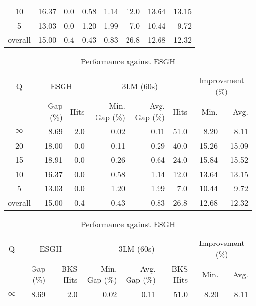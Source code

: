 \begin{table}[H]
\begin{tabular}{c rr rrr rr}
      10 &    16.37 &  0.0 &          0.58 &          1.14 & 12.0 &            13.64 & 13.15 \\
       5 &    13.03 &  0.0 &          1.20 &          1.99 &  7.0 &            10.44 &  9.72 \\
\midrule
 overall &    15.00 &  0.4 &          0.43 &          0.83 & 26.8 &            12.68 & 12.32 \\
\bottomrule
\end{tabular}
\end{table}\begin{table}[H]
\centering
\caption{Performance against ESGH}
\label{tab:3lm_resuts_kritikos1}
\begin{tabular}{c rr rrr rr}
\toprule
       Q & \multicolumn{2}{c}{ESGH} & \multicolumn{3}{c}{3LM (60s)} & \multicolumn{2}{c}{Improvement (\%)} \\
         & Gap (\%) & Hits & Min. Gap (\%) & Avg. Gap (\%) & Hits &             Min. &  Avg. \\
\midrule
$\infty$ &     8.69 &  2.0 &          0.02 &          0.11 & 51.0 &             8.20 &  8.11 \\
      20 &    18.00 &  0.0 &          0.11 &          0.29 & 40.0 &            15.26 & 15.09 \\
      15 &    18.91 &  0.0 &          0.26 &          0.64 & 24.0 &            15.84 & 15.52 \\
      10 &    16.37 &  0.0 &          0.58 &          1.14 & 12.0 &            13.64 & 13.15 \\
       5 &    13.03 &  0.0 &          1.20 &          1.99 &  7.0 &            10.44 &  9.72 \\
\midrule
 overall &    15.00 &  0.4 &          0.43 &          0.83 & 26.8 &            12.68 & 12.32 \\
\bottomrule
\end{tabular}
\end{table}\begin{table}[H]
\centering
\caption{Performance against ESGH}
\label{tab:3lm_resuts_kritikos1}
\begin{tabular}{c rr rrr rr}
\toprule
       Q & \multicolumn{2}{c}{ESGH} & \multicolumn{3}{c}{3LM (60s)} & \multicolumn{2}{c}{Improvement (\%)} \\
         & Gap (\%) & BKS Hits & Min. Gap (\%) & Avg. Gap (\%) & BKS Hits &             Min. &  Avg. \\
\midrule
$\infty$ &     8.69 &      2.0 &          0.02 &          0.11 &     51.0 &             8.20 &  8.11 \\

\end{tabular}
\end{table}
